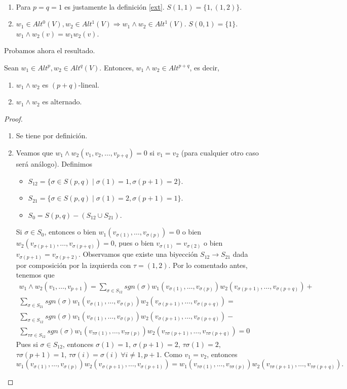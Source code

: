 \documentclass[cursovd_portada.tex]{subfiles}
\begin{document}
\begin{nota}\
\begin{enumerate}
\item Para $p=q=1$ es justamente la definición \ref{ext}. $S(1,1)=\{1,(1,2)\}$.
\item $w_1\in Alt^0(V), w_2\in Alt^1(V)\Rightarrow w_1\land w_2\in Alt^1(V)$. $S(0,1)=\{1\}$. $w_1\land w_2(v)=w_1 w_2(v)$.
\end{enumerate}
Probamos ahora el resultado. 

\begin{lemma}
Sean $w_1\in Alt^p,w_2\in Alt^{q}(V)$. Entonces, $w_1\land w_2\in Alt^{p+q}$, es decir,
\begin{enumerate}
\item $w_1\land w_2$ es $(p+q)$-lineal.
\item $w_1\land w_2$ es alternado.
\end{enumerate}
\end{lemma}
\begin{proof}\
\begin{enumerate}
\item Se tiene por definición.
\item Veamos que $w_1\land w_2(v_1,v_2,\dots, v_{p+q})=0$ si $v_1=v_2$ (para cualquier otro caso será análogo). Definimos
\begin{itemize}
\item $S_{12}=\{\sigma\in S(p,q)\mid \sigma(1)=1,\sigma(p+1)=2\}$.
\item $S_{21}=\{\sigma\in S(p,q)\mid \sigma(1)=2,\sigma(p+1)=1\}$.
\item $S_0=S(p,q)-(S_{12}\cup S_{21})$.
\end{itemize}
Si $\sigma\in S_0$, entonces o bien $w_1(v_{\sigma(1)},\dots, v_{\sigma(p)})=0$ o bien $w_2(v_{\sigma(p+1)},\dots, v_{\sigma(p+q)})=0$, pues o bien $v_{\sigma(1)}=v_{\sigma(2)}$ o bien $v_{\sigma(p+1)}=v_{\sigma(p+2)}$.
Observamos que existe una biyección $S_{12}\to S_{21}$ dada por composición por la izquierda con $\tau=(1,2)$. Por lo comentado antes, tenemos que
\begin{gather*}
w_1\land w_2(v_1,\dots, v_{p+1})=\sum_{\sigma\in S_{12}}sgn(\sigma)w_1(v_{\sigma(1)},\dots, v_{\sigma(p)})w_2(v_{\sigma(p+1)},\dots,v_{\sigma(p+q)})+\\
\sum_{\sigma\in S_{21}}sgn(\sigma)w_1(v_{\sigma(1)},\dots, v_{\sigma(p)})w_2(v_{\sigma(p+1)},\dots,v_{\sigma(p+q)})=\\
\sum_{\sigma\in S_{12}}sgn(\sigma)w_1(v_{\sigma(1)},\dots, v_{\sigma(p)})w_2(v_{\sigma(p+1)},\dots,v_{\sigma(p+q)})-\\
\sum_{\tau\sigma\in S_{12}}sgn(\sigma)w_1(v_{\tau\sigma(1)},\dots, v_{\tau\sigma(p)})w_2(v_{\tau\sigma(p+1)},\dots,v_{\tau\sigma(p+q)})=0
\end{gather*}
Pues si $\sigma\in S_{12}$, entonces $\sigma(1)=1$, $\sigma(p+1)=2$, $\tau\sigma(1)=2$, $\tau\sigma(p+1)=1$, $\tau\sigma(i)=\sigma(i)\ \forall i\neq 1,p+1$. Como $v_1=v_2$, entonces $$w_1(v_{\sigma(1)},\dots,v_{\sigma(p)})w_2(v_{\sigma(p+1)},\dots, v_{\sigma(p+1)})=w_1(v_{\tau\sigma(1)},\dots, v_{\tau\sigma(p)})w_2(v_{\tau\sigma(p+1)},\dots, v_{\tau\sigma(p+q)}).$$
\end{enumerate}
\end{proof}
\end{nota}
\end{document}
